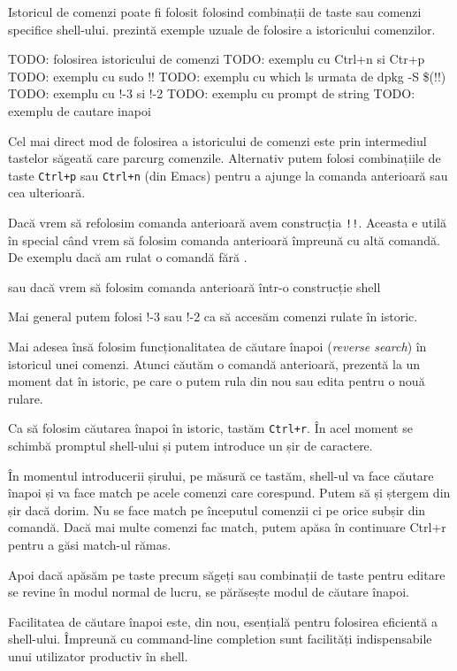Istoricul de comenzi poate fi folosit folosind combinații de taste sau comenzi specifice shell-ului.  prezintă exemple uzuale de folosire a istoricului comenzilor.

\begin{screen}[caption={Folosirea istoricului de comenzi},label={lst:cli:use-history}]
TODO: folosirea istoricului de comenzi
TODO: exemplu cu Ctrl+n si Ctr+p
TODO: exemplu cu sudo !!
TODO: exemplu cu which ls urmata de dpkg -S \$(!!)
TODO: exemplu cu !-3 si !-2
TODO: exemplu cu prompt de string
TODO: exemplu de cautare inapoi
\end{screen}

Cel mai direct mod de folosirea a istoricului de comenzi este prin intermediul
tastelor săgeată care parcurg comenzile. Alternativ putem folosi combinațiile de taste \texttt{Ctrl+p} sau
\texttt{Ctrl+n} (din Emacs) pentru a ajunge la comanda anterioară sau cea ulterioară.

Dacă vrem să refolosim comanda anterioară avem construcția \texttt{!!}. Aceasta e utilă
în special când vrem să folosim comanda anterioară împreună cu altă comandă. De
exemplu dacă am rulat o comandă fără .

sau dacă vrem să folosim comanda anterioară într-o construcție shell

Mai general putem folosi !-3 sau !-2 ca să accesăm comenzi rulate în istoric.

Mai adesea însă folosim funcționalitatea de căutare înapoi (\textit{reverse search}) în
istoricul unei comenzi. Atunci căutăm o comandă anterioară, prezentă la un
moment dat în istoric, pe care o putem rula din nou sau edita pentru o nouă
rulare.

Ca să folosim căutarea înapoi în istoric, tastăm \texttt{Ctrl+r}. În acel moment se
schimbă promptul shell-ului și putem introduce un șir de caractere.

În momentul introducerii șirului, pe măsură ce tastăm, shell-ul va face căutare
înapoi și va face match pe acele comenzi care corespund. Putem să și ștergem din
șir dacă dorim. Nu se face match pe începutul comenzii ci pe orice subșir din
comandă. Dacă mai multe comenzi fac match, putem apăsa în continuare Ctrl+r
pentru a găsi match-ul rămas.

Apoi dacă apăsăm pe taste precum săgeți sau combinații de taste pentru editare
se revine în modul normal de lucru, se părăsește modul de căutare înapoi.

Facilitatea de căutare înapoi este, din nou, esențială pentru folosirea
eficientă a shell-ului. Împreună cu command-line completion sunt facilități
indispensabile unui utilizator productiv în shell.


